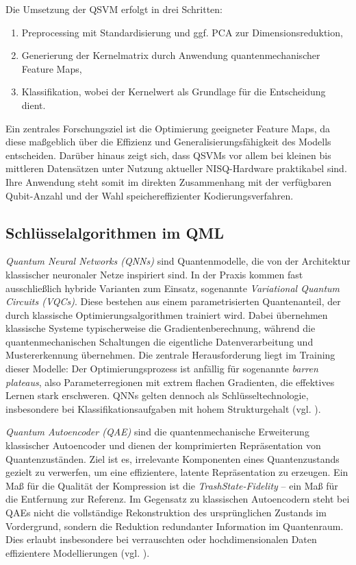 Die Umsetzung der QSVM erfolgt in drei Schritten:  
\begin{enumerate}
  \item Preprocessing mit Standardisierung und ggf. PCA zur Dimensionsreduktion,
  \item Generierung der Kernelmatrix durch Anwendung quantenmechanischer Feature Maps,
  \item Klassifikation, wobei der Kernelwert als Grundlage für die Entscheidung dient.
\end{enumerate}  
Ein zentrales Forschungsziel ist die Optimierung geeigneter Feature Maps, da diese maßgeblich über die Effizienz und Generalisierungsfähigkeit des Modells entscheiden. Darüber hinaus zeigt sich, dass QSVMs vor allem bei kleinen bis mittleren Datensätzen unter Nutzung aktueller NISQ-Hardware praktikabel sind. Ihre Anwendung steht somit im direkten Zusammenhang mit der verfügbaren Qubit-Anzahl und der Wahl speichereffizienter Kodierungsverfahren.  


\subsection{Schlüsselalgorithmen im QML}

\textit{Quantum Neural Networks (QNNs)} 
sind Quantenmodelle, die von der Architektur klassischer neuronaler Netze inspiriert sind. In der Praxis kommen fast ausschließlich hybride Varianten zum Einsatz, sogenannte \textit{Variational Quantum Circuits (VQCs)}. Diese bestehen aus einem parametrisierten Quantenanteil, der durch klassische Optimierungsalgorithmen trainiert wird. Dabei übernehmen klassische Systeme typischerweise die Gradientenberechnung, während die quantenmechanischen Schaltungen die eigentliche Datenverarbeitung und Mustererkennung übernehmen. Die zentrale Herausforderung liegt im Training dieser Modelle: Der Optimierungsprozess ist anfällig für sogenannte \textit{barren plateaus}, also Parameterregionen mit extrem flachen Gradienten, die effektives Lernen stark erschweren. QNNs gelten dennoch als Schlüsseltechnologie, insbesondere bei Klassifikationsaufgaben mit hohem Strukturgehalt (vgl. \cite{liuQuantumTrainRethinkingHybrid2024}).

\vspace{0.3cm}
\textit{Quantum Autoencoder (QAE)} sind die quantenmechanische Erweiterung klassischer Autoencoder und dienen der komprimierten Repräsentation von Quantenzuständen. Ziel ist es, irrelevante Komponenten eines Quantenzustands gezielt zu verwerfen, um eine effizientere, latente Repräsentation zu erzeugen. Ein Maß für die Qualität der Kompression ist die \textit{TrashState-Fidelity} – ein Maß für die Entfernung zur Referenz. Im Gegensatz zu klassischen Autoencodern steht bei QAEs nicht die vollständige Rekonstruktion des ursprünglichen Zustands im Vordergrund, sondern die Reduktion redundanter Information im Quantenraum. Dies erlaubt insbesondere bei verrauschten oder hochdimensionalen Daten effizientere Modellierungen (vgl. \cite{ngairangbam_anomaly_2022, schuld_et_al_quantum_2019}).

